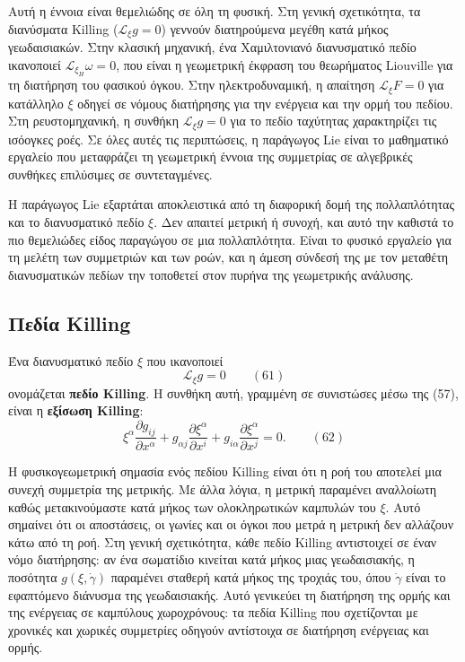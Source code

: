 \documentclass[12pt]{article}
\begin{document}
Αυτή η έννοια είναι θεμελιώδης σε όλη τη φυσική. Στη γενική σχετικότητα, τα διανύσματα Killing ($\mathcal{L}_\xi g = 0$) γεννούν διατηρούμενα μεγέθη κατά μήκος γεωδαισιακών. Στην κλασική μηχανική, ένα Χαμιλτονιανό διανυσματικό πεδίο ικανοποιεί $\mathcal{L}_{\xi_H} \omega = 0$, που είναι η γεωμετρική έκφραση του θεωρήματος Liouville για τη διατήρηση του φασικού όγκου. Στην ηλεκτροδυναμική, η απαίτηση $\mathcal{L}_\xi F = 0$ για κατάλληλο $\xi$ οδηγεί σε νόμους διατήρησης για την ενέργεια και την ορμή του πεδίου. Στη ρευστομηχανική, η συνθήκη $\mathcal{L}_\xi g = 0$ για το πεδίο ταχύτητας χαρακτηρίζει τις ισόογκες ροές. Σε όλες αυτές τις περιπτώσεις, η παράγωγος Lie είναι το μαθηματικό εργαλείο που μεταφράζει τη γεωμετρική έννοια της συμμετρίας σε αλγεβρικές συνθήκες επιλύσιμες σε συντεταγμένες.

Η παράγωγος Lie εξαρτάται αποκλειστικά από τη διαφορική δομή της πολλαπλότητας και το διανυσματικό πεδίο $\xi$. Δεν απαιτεί μετρική ή συνοχή, και αυτό την καθιστά το πιο θεμελιώδες είδος παραγώγου σε μια πολλαπλότητα. Είναι το φυσικό εργαλείο για τη μελέτη των συμμετριών και των ροών, και η άμεση σύνδεσή της με τον μεταθέτη διανυσματικών πεδίων την τοποθετεί στον πυρήνα της γεωμετρικής ανάλυσης.

\subsection{Πεδία Killing}

Ένα διανυσματικό πεδίο $\xi$ που ικανοποιεί
\begin{equation}
\mathcal{L}_\xi g = 0 \qquad (61)
\end{equation}
ονομάζεται \textbf{πεδίο Killing}. Η συνθήκη αυτή, γραμμένη σε συνιστώσες μέσω της (57), είναι η \textbf{εξίσωση Killing}:
\begin{equation}
\xi^\alpha \frac{\partial g_{ij}}{\partial x^\alpha} + g_{\alpha j} \frac{\partial \xi^\alpha}{\partial x^i} + g_{i\alpha} \frac{\partial \xi^\alpha}{\partial x^j} = 0. \qquad (62)
\end{equation}

Η φυσικογεωμετρική σημασία ενός πεδίου Killing είναι ότι η ροή του αποτελεί μια συνεχή συμμετρία της μετρικής. Με άλλα λόγια, η μετρική παραμένει αναλλοίωτη καθώς μετακινούμαστε κατά μήκος των ολοκληρωτικών καμπυλών του $\xi$. Αυτό σημαίνει ότι οι αποστάσεις, οι γωνίες και οι όγκοι που μετρά η μετρική δεν αλλάζουν κάτω από τη ροή. Στη γενική σχετικότητα, κάθε πεδίο Killing αντιστοιχεί σε έναν νόμο διατήρησης: αν ένα σωματίδιο κινείται κατά μήκος μιας γεωδαισιακής, η ποσότητα $g(\xi, \dot{\gamma})$ παραμένει σταθερή κατά μήκος της τροχιάς του, όπου $\dot{\gamma}$ είναι το εφαπτόμενο διάνυσμα της γεωδαισιακής. Αυτό γενικεύει τη διατήρηση της ορμής και της ενέργειας σε καμπύλους χωροχρόνους: τα πεδία Killing που σχετίζονται με χρονικές και χωρικές συμμετρίες οδηγούν αντίστοιχα σε διατήρηση ενέργειας και ορμής.
\end{document}
